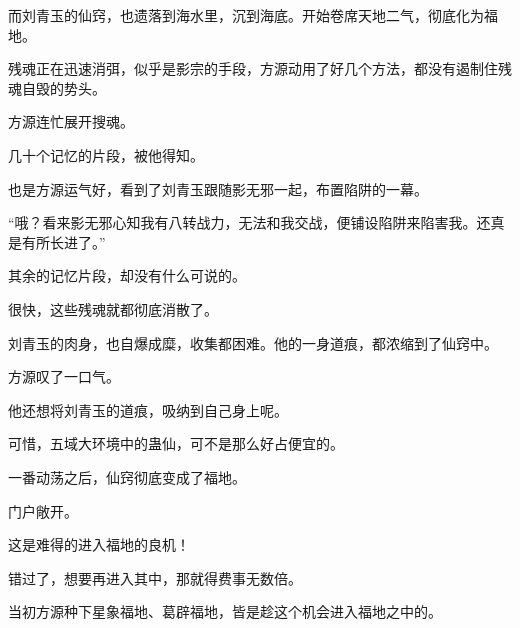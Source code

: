 \begin{this_body}
而刘青玉的仙窍，也遗落到海水里，沉到海底。开始卷席天地二气，彻底化为福地。

残魂正在迅速消弭，似乎是影宗的手段，方源动用了好几个方法，都没有遏制住残魂自毁的势头。

方源连忙展开搜魂。

几十个记忆的片段，被他得知。

也是方源运气好，看到了刘青玉跟随影无邪一起，布置陷阱的一幕。

“哦？看来影无邪心知我有八转战力，无法和我交战，便铺设陷阱来陷害我。还真是有所长进了。”

其余的记忆片段，却没有什么可说的。

很快，这些残魂就都彻底消散了。

刘青玉的肉身，也自爆成糜，收集都困难。他的一身道痕，都浓缩到了仙窍中。

方源叹了一口气。

他还想将刘青玉的道痕，吸纳到自己身上呢。

可惜，五域大环境中的蛊仙，可不是那么好占便宜的。

一番动荡之后，仙窍彻底变成了福地。

门户敞开。

这是难得的进入福地的良机！

错过了，想要再进入其中，那就得费事无数倍。

当初方源种下星象福地、葛辟福地，皆是趁这个机会进入福地之中的。

\end{this_body}

